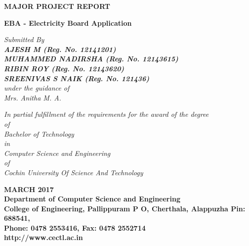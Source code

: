 \documentclass[12pt,a4paper,oneside]{report}
\begin{document}
\begin{titlepage}
\begin{center}

\large{\textbf{MAJOR PROJECT REPORT}}\\
\begin{singlespace}
\LARGE{\textbf{EBA - Electricity Board Application }}\\
\end{singlespace}


\Large{\textit{Submitted By }}\\
\Large{\textit{\textbf{AJESH M (Reg. No. 12141201)}}} \\
\Large{\textit{\textbf{MUHAMMED NADIRSHA (Reg. No. 12143615)}}} \\
\Large{\textit{\textbf{RIBIN ROY (Reg. No. 12143620)}}} \\
\Large{\textit{\textbf{SREENIVAS S NAIK (Reg. No. 121436)}}} \\
\Large{\textit{\textit{under the guidance of}}}\\
\Large{\textit{Mrs. Anitha M. A.}}\\
\begin{singlespace}
\large{\textit{In partial fulfillment of the requirements for the award of the degree}\\
\large{ \textit{of}}\\
\large{\textit{Bachelor of Technology} }\\
\large{\textit{in}}\\
\large{\textit{Computer Science and Engineering}}\\
\large{\textit{of}}\\
\large{\textit{Cochin University Of Science And Technology }}}\\
\end{singlespace}
\begin{figure}[h]
\begin{center}
\end{center}
\end{figure}
\begin{singlespace}

\Large{\textbf{MARCH 2017\\Department of Computer Science and Engineering\\College of Engineering, Pallippuram P O, Cherthala, Alappuzha Pin: 688541, \\Phone: 0478 2553416, Fax: 0478 2552714\\http://www.cectl.ac.in}}
\end{singlespace}
\end{center}
\end{titlepage}
\end{document}
